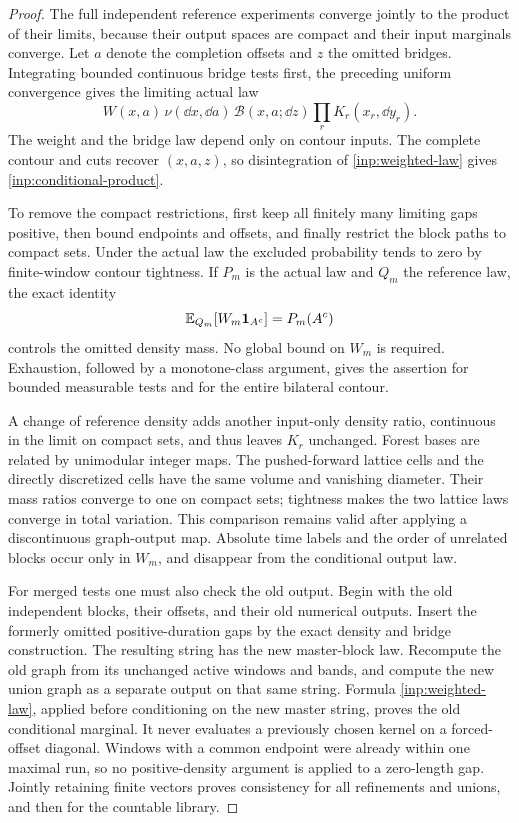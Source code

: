 \begin{proof}
The full independent reference experiments converge jointly to the
product of their limits, because their output spaces are compact
and their input marginals converge.  Let $a$ denote the completion
offsets and $z$ the omitted bridges.  Integrating bounded continuous
bridge tests first, the preceding uniform convergence gives the
limiting actual law
\begin{equation}\label{inp:weighted-law}
 W(x,a)\,\nu(\dd x,\dd a)\,
       \mathcal B(x,a;\dd z)\prod_rK_r(x_r,\dd y_r).
\end{equation}
The weight and the bridge law depend only on contour inputs.
The complete contour and cuts recover $(x,a,z)$, so disintegration
of \eqref{inp:weighted-law} gives \eqref{inp:conditional-product}.

To remove the compact restrictions, first keep all finitely many
limiting gaps positive, then bound endpoints and offsets, and
finally restrict the block paths to compact sets.  Under the actual
law the excluded probability tends to zero by finite-window contour
tightness.  If $P_m$ is the actual law and $Q_m$ the reference law,
the exact identity
\[
             \mathbb E_{Q_m}[W_m\mathbf 1_{A^c}]=P_m(A^c)
\]
controls the omitted density mass.  No global bound on $W_m$ is
required.  Exhaustion, followed by a monotone-class argument, gives
the assertion for bounded measurable tests and for the entire
bilateral contour.

A change of reference density adds another input-only density
ratio, continuous in the limit on compact sets, and thus leaves
$K_r$ unchanged.  Forest bases are related by unimodular integer
maps.  The pushed-forward lattice cells and the directly discretized
cells have the same volume and vanishing diameter.  Their mass
ratios converge to one on compact sets; tightness makes the two
lattice laws converge in total variation.  This comparison remains
valid after applying a discontinuous graph-output map.  Absolute
time labels and the order of unrelated blocks occur only in
$W_m$, and disappear from the conditional output law.

For merged tests one must also check the old output.  Begin with
the old independent blocks, their offsets, and their old numerical
outputs.  Insert the formerly omitted positive-duration gaps by
the exact density and bridge construction.  The resulting string
has the new master-block law.  Recompute the old graph from its
unchanged active windows and bands, and compute the new union graph
as a separate output on that same string.  Formula
\eqref{inp:weighted-law}, applied before conditioning on the new
master string, proves the old conditional marginal.  It never
evaluates a previously chosen kernel on a forced-offset diagonal.
Windows with a common endpoint were already within one maximal
run, so no positive-density argument is applied to a zero-length
gap.  Jointly retaining finite vectors proves consistency for all
refinements and unions, and then for the countable library.


\end{proof}
